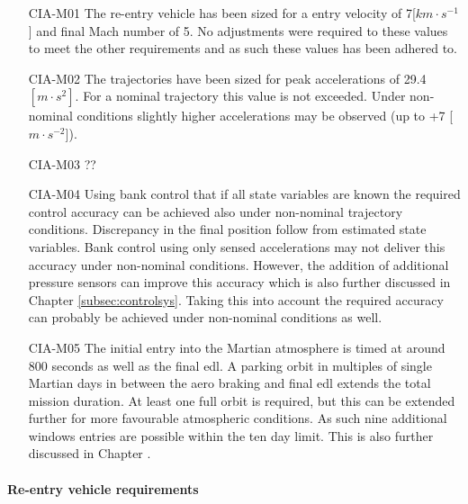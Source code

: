\begin{itemize}
\item[CIA-M01]	The re-entry vehicle has been sized for a entry velocity of 7[$km \cdot s^{-1}$] and final Mach number of 5. No adjustments were required to these values to meet the other requirements and as such these values has been adhered to. 
\item[CIA-M02]	The trajectories have been sized for peak accelerations of 29.4 $[m \cdot s^{2}]$. For a nominal trajectory this value is not exceeded. Under non-nominal conditions slightly higher accelerations may be observed (up to +7 [$m \cdot s ^{-2}$]). 
\item[CIA-M03] ??
\item[CIA-M04]	Using bank control that if all state variables are known the required control accuracy can be achieved also under non-nominal trajectory conditions. Discrepancy in the final position follow from estimated state variables. Bank control using only sensed accelerations may not deliver this accuracy under non-nominal conditions. However, the addition of additional pressure sensors can improve this accuracy which is also further discussed in Chapter \ref{subsec:controlsys}. Taking this into account the required accuracy can probably be achieved under non-nominal conditions as well.
\item[CIA-M05] The initial entry into the Martian atmosphere is timed at around 800 seconds as well as the final \gls{edl}. A parking orbit in multiples of single Martian days in between the aero braking and final \gls{edl} extends the total mission duration. At least one full orbit is required, but this can be extended further for more favourable atmospheric conditions. As such nine additional windows entries are possible within the ten day limit. This is also further discussed  in Chapter \label{sec:trajectorydesign}.

\end{itemize}

\paragraph{Re-entry vehicle requirements}


